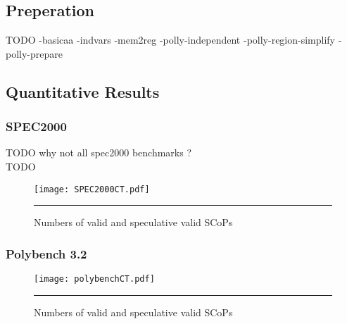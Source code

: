 \subsection{Preperation}
TODO
 -basicaa -indvars -mem2reg -polly-independent -polly-region-simplify -polly-prepare 


\subsection{Quantitative Results}

\subsubsection{SPEC2000}
TODO why not all spec2000 benchmarks ? \\
TODO 
\begin{figure}[htbp]
	\centering
        \texttt{[image: SPEC2000CT.pdf]}
		\rule{35em}{0.5pt}
	\caption{Numbers of valid and speculative valid SCoPs}
	\label{fig:SPEC2000CT}
\end{figure}

\subsubsection{Polybench 3.2}
\begin{figure}[htbp]
	\centering
        \texttt{[image: polybenchCT.pdf]}
		\rule{35em}{0.5pt}
	\caption{Numbers of valid and speculative valid SCoPs}
	\label{fig:polybenchCT}
\end{figure}


